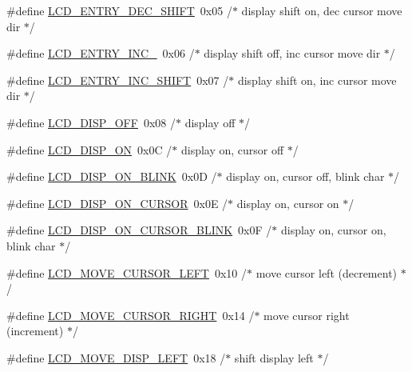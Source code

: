 \begin{DoxyCompactItemize}
\item 
\#define \mbox{\hyperlink{group__pfleury__lcd_ga1c62932f252c6262cbef728add9696e4}{L\+C\+D\+\_\+\+E\+N\+T\+R\+Y\+\_\+\+D\+E\+C\+\_\+\+S\+H\+I\+FT}}~0x05   /$\ast$ display shift on,  dec cursor move dir $\ast$/
\item 
\#define \mbox{\hyperlink{group__pfleury__lcd_gad27ddc4b8d03594662c8757f946dde28}{L\+C\+D\+\_\+\+E\+N\+T\+R\+Y\+\_\+\+I\+N\+C\+\_\+}}~0x06   /$\ast$ display shift off, inc cursor move dir $\ast$/
\item 
\#define \mbox{\hyperlink{group__pfleury__lcd_gafabd0215cc6ae5539dc638dbec44a506}{L\+C\+D\+\_\+\+E\+N\+T\+R\+Y\+\_\+\+I\+N\+C\+\_\+\+S\+H\+I\+FT}}~0x07   /$\ast$ display shift on,  inc cursor move dir $\ast$/
\item 
\#define \mbox{\hyperlink{group__pfleury__lcd_gaa2966175115943883f51e9c90478540c}{L\+C\+D\+\_\+\+D\+I\+S\+P\+\_\+\+O\+FF}}~0x08   /$\ast$ display off                            $\ast$/
\item 
\#define \mbox{\hyperlink{group__pfleury__lcd_ga5163a96b133868975c0738e180b30cb8}{L\+C\+D\+\_\+\+D\+I\+S\+P\+\_\+\+ON}}~0x0\+C   /$\ast$ display on, cursor off                 $\ast$/
\item 
\#define \mbox{\hyperlink{group__pfleury__lcd_ga470cef85de53e37356b22c66a357a764}{L\+C\+D\+\_\+\+D\+I\+S\+P\+\_\+\+O\+N\+\_\+\+B\+L\+I\+NK}}~0x0\+D   /$\ast$ display on, cursor off, blink char     $\ast$/
\item 
\#define \mbox{\hyperlink{group__pfleury__lcd_gaf56b6d6bdb6fa48b26106dee5f74ae1f}{L\+C\+D\+\_\+\+D\+I\+S\+P\+\_\+\+O\+N\+\_\+\+C\+U\+R\+S\+OR}}~0x0\+E   /$\ast$ display on, cursor on                  $\ast$/
\item 
\#define \mbox{\hyperlink{group__pfleury__lcd_gac1984ed0db15c6991d34c184fdca5dc6}{L\+C\+D\+\_\+\+D\+I\+S\+P\+\_\+\+O\+N\+\_\+\+C\+U\+R\+S\+O\+R\+\_\+\+B\+L\+I\+NK}}~0x0\+F   /$\ast$ display on, cursor on, blink char      $\ast$/
\item 
\#define \mbox{\hyperlink{group__pfleury__lcd_gac2f0ddce1daaa1bf1a016270a89a264b}{L\+C\+D\+\_\+\+M\+O\+V\+E\+\_\+\+C\+U\+R\+S\+O\+R\+\_\+\+L\+E\+FT}}~0x10   /$\ast$ move cursor left  (decrement)          $\ast$/
\item 
\#define \mbox{\hyperlink{group__pfleury__lcd_ga0ad58e39e053e97d34527fcbe936899b}{L\+C\+D\+\_\+\+M\+O\+V\+E\+\_\+\+C\+U\+R\+S\+O\+R\+\_\+\+R\+I\+G\+HT}}~0x14   /$\ast$ move cursor right (increment)          $\ast$/
\item 
\#define \mbox{\hyperlink{group__pfleury__lcd_gab3c34ff1eee238bbe9c677215219fb8e}{L\+C\+D\+\_\+\+M\+O\+V\+E\+\_\+\+D\+I\+S\+P\+\_\+\+L\+E\+FT}}~0x18   /$\ast$ shift display left                     $\ast$/

\end{DoxyCompactItemize}

